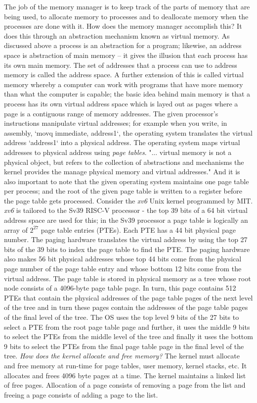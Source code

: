 \documentclass{amsbook}
\begin{document}
The job of the memory manager is to keep track of the parts of memory that are being used, to allocate memory to processes and to deallocate memory when the processes are done with it. How does the memory manager accomplish this? It does this through an abstraction mechanism known as virtual memory. As discussed above a process is an abstraction for a program; likewise, an address space is abstraction of main memory -- it gives the illusion that each process has its own main memory. The set of addresses that a process can use to address memory is called the address space. A further extension of this is called virtual memory whereby a computer can work with programs that have more memory than what the computer is capable; the basic idea behind main memory is that a process has its own virtual address space which is layed out as pages where a page is a contiguous range of memory addresses. The given processor's instructions manipulate virtual addresses; for example when you write, in assembly, `movq immediate, address1`, the operating system translates the virtual address `address1` into a physical address. The operating system maps virtual addresses to physical address using \textit{page tables}. "... virtual memory is not a physical object, but refers to the collection of abstractions and mechanisms the kernel provides the manage physical memory and virtual addresses." And it is also important to note that the given operating system maintains one page table per process; and the root of the given page table is written to a register before the page table gets processed. Consider the \textit{xv6} Unix kernel programmed by MIT. \textit{xv6} is tailored to the Sv39 RISC-V processor - the top 39 bits of a 64 bit virtual address space are used for this; in the Sv39 processor a page table is logically an array of $2^{27}$ page table entries (PTEs). Each PTE has a 44 bit physical page number. The paging hardware translates the virtual address by using the top 27 bits of the 39 bits to index the page table to find the PTE. The paging hardware also makes 56 bit physical addresses whose top 44  bits come from the physical page number of the page table entry and whose bottom 12 bits come from the virtual address. The page table is stored in physical memory as a tree whose root node consists of a 4096-byte page table page. In turn, this page contains 512 PTEs that contain the physical addresses of the page table pages of the next level of the tree and in turn these pages contain the addresses of the page table pages of the final level of the tree. The OS uses the top level 9 bits of the 27 bits to select a PTE from the root page table page and further, it uses the middle 9 bits to select the PTEs from the middle level of the tree and finally it uses the bottom 9 bits to select the PTEs from the final page table page in the final level of the tree. \textit{How does the kernel allocate and free memory?} The kernel must allocate and free memory at run-time for page tables, user memory, kernel stacks, etc. It allocates and frees 4096 byte pages at a time. The kernel maintains a linked list of free pages. Allocation of a page consists of removing a page from the list and freeing a page consists of adding a page to the list.
\end{document}
